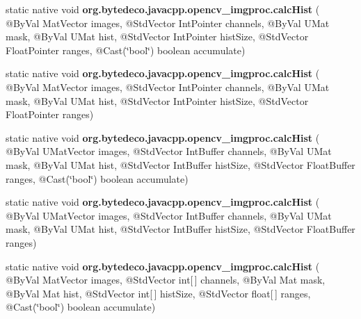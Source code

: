 \begin{DoxyCompactItemize}
\item 
\mbox{\label{group__imgproc__hist_ga46f6a1802466c6bf6695ce2ae67a6d7a}} 
static native void {\bfseries org.\+bytedeco.\+javacpp.\+opencv\+\_\+imgproc.\+calc\+Hist} ( @By\+Val Mat\+Vector images, @Std\+Vector Int\+Pointer channels, @By\+Val U\+Mat mask, @By\+Val U\+Mat hist, @Std\+Vector Int\+Pointer hist\+Size, @Std\+Vector Float\+Pointer ranges, @Cast(\char`\"{}bool\char`\"{}) boolean accumulate)
\item 
\mbox{\label{group__imgproc__hist_ga09b19271ab093192e12bde6d6ecdb9d6}} 
static native void {\bfseries org.\+bytedeco.\+javacpp.\+opencv\+\_\+imgproc.\+calc\+Hist} ( @By\+Val Mat\+Vector images, @Std\+Vector Int\+Pointer channels, @By\+Val U\+Mat mask, @By\+Val U\+Mat hist, @Std\+Vector Int\+Pointer hist\+Size, @Std\+Vector Float\+Pointer ranges)
\item 
\mbox{\label{group__imgproc__hist_ga99e03af5e4f4124da1f330d7e1a4b1ad}} 
static native void {\bfseries org.\+bytedeco.\+javacpp.\+opencv\+\_\+imgproc.\+calc\+Hist} ( @By\+Val U\+Mat\+Vector images, @Std\+Vector Int\+Buffer channels, @By\+Val U\+Mat mask, @By\+Val U\+Mat hist, @Std\+Vector Int\+Buffer hist\+Size, @Std\+Vector Float\+Buffer ranges, @Cast(\char`\"{}bool\char`\"{}) boolean accumulate)
\item 
\mbox{\label{group__imgproc__hist_ga1ff60a43309a955a7a64082289d6116a}} 
static native void {\bfseries org.\+bytedeco.\+javacpp.\+opencv\+\_\+imgproc.\+calc\+Hist} ( @By\+Val U\+Mat\+Vector images, @Std\+Vector Int\+Buffer channels, @By\+Val U\+Mat mask, @By\+Val U\+Mat hist, @Std\+Vector Int\+Buffer hist\+Size, @Std\+Vector Float\+Buffer ranges)
\item 
\mbox{\label{group__imgproc__hist_gab99d8476b8aa00ecef6621e0926e2145}} 
static native void {\bfseries org.\+bytedeco.\+javacpp.\+opencv\+\_\+imgproc.\+calc\+Hist} ( @By\+Val Mat\+Vector images, @Std\+Vector int\mbox{[}$\,$\mbox{]} channels, @By\+Val Mat mask, @By\+Val Mat hist, @Std\+Vector int\mbox{[}$\,$\mbox{]} hist\+Size, @Std\+Vector float\mbox{[}$\,$\mbox{]} ranges, @Cast(\char`\"{}bool\char`\"{}) boolean accumulate)
\item 
\mbox{\label{group__imgproc__hist_gae6a213f0decf4b3e375a0c06e56f546d}} 

\end{DoxyCompactItemize}
